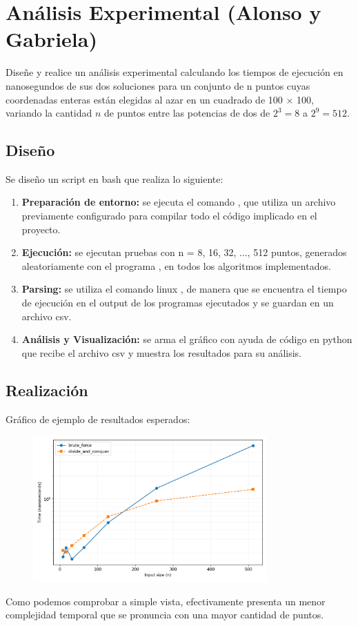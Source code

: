 \documentclass[main.tex]{subfiles}
\begin{document}
\section{Análisis Experimental (Alonso y Gabriela)}
Diseñe y realice un análisis experimental calculando los tiempos de
ejecución en nanosegundos de sus dos soluciones para un conjunto de n puntos cuyas coordenadas
enteras están elegidas al azar en un cuadrado de 100 × 100, variando la cantidad $n$ de puntos entre
las potencias de dos de $2^3 = 8$ a $2^9 = 512$.

\subsection{Diseño}

Se diseño un script en bash  que realiza lo siguiente:
\begin{enumerate}
	\item \textbf{Preparación de entorno:} se ejecuta el comando , que utiliza
	      un archivo  previamente configurado para compilar todo el código implicado en
	      el proyecto.
	\item \textbf{Ejecución:} se ejecutan pruebas con n = 8, 16, 32, ..., 512
	      puntos, generados aleatoriamente con el programa , en todos los
	      algoritmos implementados.
	\item \textbf{Parsing:} se utiliza el comando linux , de manera que se
	      encuentra el tiempo de ejecución en el output de los programas ejecutados y se guardan en un
	      archivo csv.
	\item \textbf{Análisis y Visualización:} se arma el gráfico con ayuda de código en python que
	      recibe el archivo csv y muestra los resultados para su análisis.
\end{enumerate}

\subsection{Realización}

Gráfico de ejemplo de resultados esperados:
\begin{figure}[h]
	\centering \includegraphics[width=0.8\textwidth]{img/plot_bf_dv.png}
\end{figure}
Como podemos comprobar a simple vista, efectivamente  presenta un menor
complejidad temporal que se pronuncia con una mayor cantidad de puntos.
\end{document}
